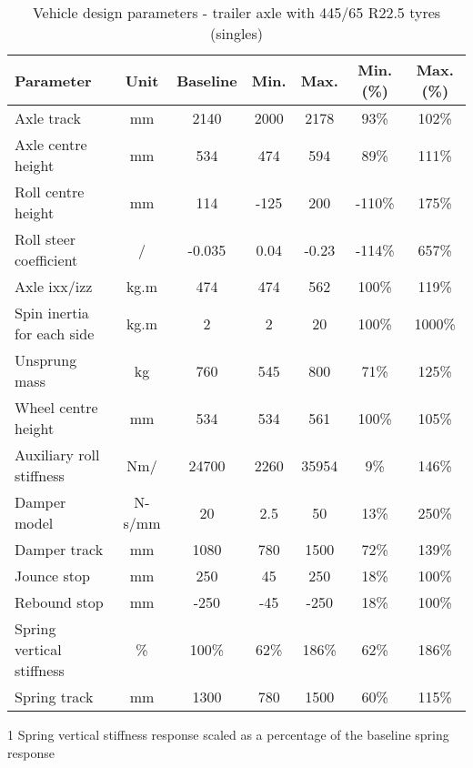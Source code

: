 \begin{table}[H]
	\centering\footnotesize
	\begin{threeparttable}

		\begin{tabulary}{\textwidth}{lcccccc}
			\toprule
			\textbf{Parameter} & \textbf{Unit} & \textbf{Baseline} & \textbf{Min.} & \textbf{Max.} & \textbf{Min. (\%)} & \textbf{Max. (\%)} \\

			\midrule
			Axle track & mm    & 2140  & 2000  & 2178  & 93\%  & 102\% \\
			Axle centre height & mm    & 534   & 474   & 594   & 89\%  & 111\% \\
			Roll centre height & mm    & 114   & -125  & 200   & -110\% & 175\% \\
			Roll steer coefficient & \degree{}/\degree{} & -0.035 & 0.04  & -0.23 & -114\% & 657\% \\
			Axle \gls{ixx}/\gls{izz}  & kg.m\sstw{} & 474   & 474   & 562   & 100\% & 119\% \\
			Spin inertia for each side & kg.m\sstw{} & 2     & 2     & 20    & 100\% & 1000\% \\
			Unsprung mass  & kg    & 760   & 545   & 800   & 71\%  & 125\% \\
			Wheel centre height & mm    & 534   & 534   & 561   & 100\% & 105\% \\
			Auxiliary roll stiffness  & Nm/\degree{} & 24700 & 2260  & 35954 & 9\%   & 146\% \\
			Damper model & N-s/mm & 20    & 2.5   & 50    & 13\%  & 250\% \\
			Damper track & mm    & 1080  & 780   & 1500  & 72\%  & 139\% \\
			Jounce stop & mm    & 250   & 45    & 250   & 18\%  & 100\% \\
			Rebound stop & mm    & -250  & -45   & -250  & 18\%  & 100\% \\
			Spring vertical stiffness & \%  & 100\% & 62\%  & 186\% & 62\%  & 186\% \\
			Spring track & mm    & 1300  & 780   & 1500  & 60\%  & 115\% \\

			\bottomrule
		\end{tabulary}

		\caption{Vehicle design parameters - trailer axle with 445/65 R22.5 tyres (singles)}
		\label{table:vdp-range-axle-trailer-445}

		\begin{tablenotes}
			\item[1] Spring vertical stiffness response scaled as a percentage of the baseline spring response
		\end{tablenotes}

	\end{threeparttable}
\end{table}

